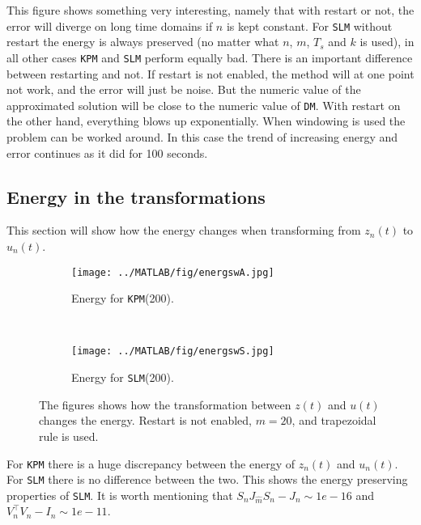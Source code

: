 \noindent This figure shows something very interesting, namely that with restart or not, the error will diverge on long time domains if $n$ is kept constant. For \texttt{SLM} without restart the energy is always preserved (no matter what $n$, $m$, $T_s$ and $k$ is used), in all other cases \texttt{KPM} and \texttt{SLM} perform equally bad. There is an important difference between restarting and not. If restart is not enabled, the method will at one point not work, and the error will just be noise. But the numeric value of the approximated solution will be close to the numeric value of \texttt{DM}. With restart on the other hand, everything blows up exponentially. When windowing is used the problem can be worked around. In this case the trend of increasing energy and error continues as it did for 100 seconds. \\

\subsection{Energy in the transformations}%
This section will show how the energy changes when transforming from $z_n(t)$ to $u_n(t)$.

\begin{figure}[H]
        \centering
        \begin{subfigure}[b]{0.45\textwidth}
                \texttt{[image: ../MATLAB/fig/energswA.jpg]}
                \caption{ Energy for \texttt{KPM}(200). }
                \label{fig:energyswA}
        \end{subfigure}
        ~
		\begin{subfigure}[b]{0.45\textwidth}
                \texttt{[image: ../MATLAB/fig/energswS.jpg]}
                \caption{ Energy for \texttt{SLM}(200). }
                \label{fig:energswS}
        \end{subfigure}        
        \caption{ The figures shows how the transformation between $z(t)$ and $u(t)$ changes the energy. Restart is not enabled, $m = 20$, and trapezoidal rule is used. }
        \label{fig:energs}
\end{figure}
\noindent For \texttt{KPM} there is a huge discrepancy between the energy of $z_{n}(t)$ and $u_{n}(t)$. For \texttt{SLM} there is no difference between the two. This shows the energy preserving properties of \texttt{SLM}. It is worth mentioning that $S_n J_{\hat{m}}S_n - J_n \sim 1e-16$ and $V_n^\top V_n - I_n \sim 1e-11$.
